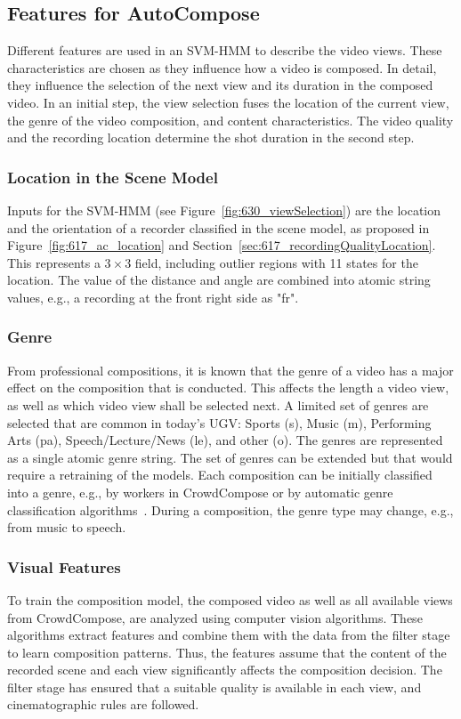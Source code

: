 \subsection{Features for AutoCompose}
Different features are used in an \ac{SVM-HMM} to describe the video views.
These characteristics are chosen as they influence how a video is composed. 
In detail, they influence the selection of the next view and its duration in the composed video.
In an initial step, the view selection fuses the location of the current view, the genre of the video composition, and content characteristics.
The video quality and the recording location determine the shot duration in the second step. 
\subsubsection{Location in the Scene Model}
Inputs for the \ac{SVM-HMM} (see Figure~\ref{fig:630_viewSelection}) are the location and the orientation of a recorder classified in the scene model, as proposed in Figure~\ref{fig:617_ac_location} and Section~\ref{sec:617_recordingQualityLocation}.
This represents a $3\times3$ field, including outlier regions with 11 states for the location.
The value of the distance and angle are combined into atomic string values, e.g., a recording at the front right side as "fr".
\subsubsection{Genre}
From professional compositions, it is known that the genre of a video has a major effect on the composition that is conducted. 
This affects the length a video view, as well as which video view shall be selected next.
A limited set of genres are selected that are common in today's \ac{UGV}: Sports (s), Music (m), Performing Arts (pa), Speech/Lecture/News (le), and other (o).
The genres are represented as a single atomic genre string. 
The set of genres can be extended but that would require a retraining of the models.
Each composition can be initially classified into a genre, e.g., by workers in CrowdCompose or by automatic genre classification algorithms~\cite{Cricri2014}.
During a composition, the genre type may change, e.g., from music to speech.

\subsubsection{Visual Features}
To train the composition model, the composed video as well as all available views from CrowdCompose, are analyzed using computer vision algorithms.
These algorithms extract features and combine them with the data from the filter stage to learn composition patterns.
Thus, the features assume that the content of the recorded scene and each view significantly affects the composition decision. 
The filter stage has ensured that a suitable quality is available in each view, and cinematographic rules are followed.

